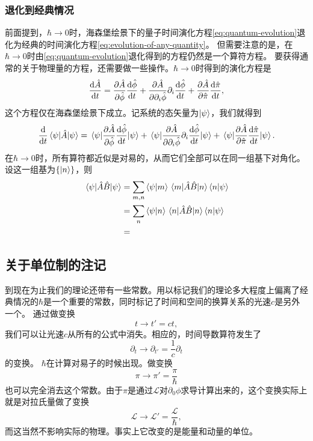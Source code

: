\documentclass[hyperref, UTF8, a4paper]{ctexart}
\begin{document}
\subsubsection{退化到经典情况}\label{sec:back-to-classical}

前面提到，$\hbar \to 0$时，海森堡绘景下的量子时间演化方程\eqref{eq:quantum-evolution}退化为经典的时间演化方程\eqref{eq:evolution-of-any-quantity}。
但需要注意的是，在$\hbar\to 0$时由\eqref{eq:quantum-evolution}退化得到的方程仍然是一个算符方程。
要获得通常的关于物理量的方程，还需要做一些操作。$\hbar\to 0$时得到的演化方程是
\[
    \dv{\hat{A}}{t} = \pdv{\hat{A}}{\hat{\phi}} \dv{\hat{\phi}}{t} + \pdv{\hat{A}}{\partial_i \hat{\phi}} \partial_i \dv{\hat{\phi}}{t} + \pdv{\hat{A}}{\hat{\pi}} \dv{\hat{\pi}}{t},
\]
这个方程仅在海森堡绘景下成立。记系统的态矢量为$\ket{\psi}$，我们就得到
\[
    \dv{t} \mel{\psi}{\hat{A}}{\psi} =  \mel{\psi}{\pdv{\hat{A}}{\hat{\phi}} \dv{\hat{\phi}}{t}}{\psi} + \mel{\psi}{\pdv{\hat{A}}{\partial_i \hat{\phi}} \partial_i \dv{\hat{\phi}}{t}}{\psi} + \mel{\psi}{\pdv{\hat{A}}{\hat{\pi}} \dv{\hat{\pi}}{t}}{\psi}.
\]
在$\hbar\to 0$时，所有算符都近似是对易的，从而它们全部可以在同一组基下对角化。设这一组基为$\{\ket{n}\}$，则
\[
    \begin{aligned}
        \mel{\psi}{\hat{A}\hat{B}}{\psi} &= \sum_{m,n} \braket{\psi}{m} \mel{m}{\hat{A}\hat{B}}{n} \braket{n}{\psi} \\
        &= \sum_{n} \braket{\psi}{n} \mel{n}{\hat{A}\hat{B}}{n} \braket{n}{\psi} \\
        &= 
    \end{aligned}
\]

\subsection{关于单位制的注记}

到现在为止我们的理论还带有一些常数。用以标记我们的理论多大程度上偏离了经典情况的$\hbar$是一个重要的常数，同时标记了时间和空间的换算关系的光速$c$是另外一个。
通过做变换
\[
    t \longrightarrow t' = ct,
\]
我们可以让光速$c$从所有的公式中消失。相应的，时间导数算符发生了
\[
    \partial_t \longrightarrow \partial_{t'} = \frac{1}{c} \partial_t
\]
的变换。
$\hbar$在计算对易子的时候出现。做变换
\[
    \pi \longrightarrow \pi' = \frac{\pi}{\hbar}
\]
也可以完全消去这个常数。由于$\pi$是通过$\mathcal{L}$对$\partial_0 \phi$求导计算出来的，这个变换实际上就是对拉氏量做了变换
\[
    \mathcal{L} \longrightarrow \mathcal{L}' = \frac{\mathcal{L}}{\hbar},
\]
而这当然不影响实际的物理。事实上它改变的是能量和动量的单位。
\end{document}
